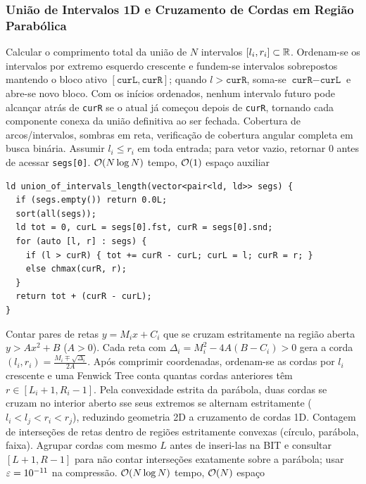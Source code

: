 \subsubsection{União de Intervalos 1D e Cruzamento de Cordas em Região Parabólica}
\algobox
  {Calcular o comprimento total da união de $N$ intervalos $[l_i, r_i] \subset \mathbb{R}$.}
  {Ordenam-se os intervalos por extremo esquerdo crescente e fundem-se intervalos sobrepostos mantendo o bloco ativo $[\texttt{curL}, \texttt{curR}]$; quando $l > \texttt{curR}$, soma-se $\texttt{curR} - \texttt{curL}$ e abre-se novo bloco.}
  {Com os inícios ordenados, nenhum intervalo futuro pode alcançar atrás de \texttt{curR} se o atual já começou depois de \texttt{curR}, tornando cada componente conexa da união definitiva ao ser fechada.}
  {Cobertura de arcos/intervalos, sombras em reta, verificação de cobertura angular completa em busca binária.}
  {Assumir $l_i \le r_i$ em toda entrada; para vetor vazio, retornar $0$ antes de acessar \texttt{segs[0]}.}
  {$\mathcal{O}(N \log N)$ tempo, $\mathcal{O}(1)$ espaço auxiliar}

\begin{lstlisting}
ld union_of_intervals_length(vector<pair<ld, ld>> segs) {
  if (segs.empty()) return 0.0L;
  sort(all(segs));
  ld tot = 0, curL = segs[0].fst, curR = segs[0].snd;
  for (auto [l, r] : segs) {
    if (l > curR) { tot += curR - curL; curL = l; curR = r; }
    else chmax(curR, r);
  }
  return tot + (curR - curL);
}
\end{lstlisting}

\algobox
  {Contar pares de retas $y = M_i x + C_i$ que se cruzam estritamente na região aberta $y > A x^2 + B$ ($A > 0$).}
  {Cada reta com $\Delta_i = M_i^2 - 4A(B - C_i) > 0$ gera a corda $(l_i, r_i) = \frac{M_i \mp \sqrt{\Delta_i}}{2A}$. Após comprimir coordenadas, ordenam-se as cordas por $l_i$ crescente e uma Fenwick Tree conta quantas cordas anteriores têm $r \in [L_i + 1, R_i - 1]$.}
  {Pela convexidade estrita da parábola, duas cordas se cruzam no interior aberto sse seus extremos se alternam estritamente ($l_i < l_j < r_i < r_j$), reduzindo geometria 2D a cruzamento de cordas 1D.}
  {Contagem de interseções de retas dentro de regiões estritamente convexas (círculo, parábola, faixa).}
  {Agrupar cordas com mesmo $L$ antes de inseri-las na BIT e consultar $[L+1, R-1]$ para não contar interseções exatamente sobre a parábola; usar $\varepsilon = 10^{-11}$ na compressão.}
  {$\mathcal{O}(N \log N)$ tempo, $\mathcal{O}(N)$ espaço}

